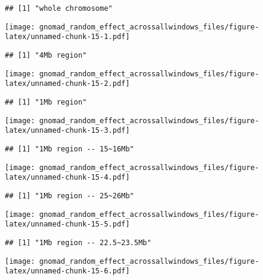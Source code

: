 \documentclass[
]{article}
\begin{document}
\begin{verbatim}
## [1] "whole chromosome"
\end{verbatim}

\texttt{[image: gnomad\_random\_effect\_acrossallwindows\_files/figure-latex/unnamed-chunk-15-1.pdf]}

\begin{verbatim}
## [1] "4Mb region"
\end{verbatim}

\texttt{[image: gnomad\_random\_effect\_acrossallwindows\_files/figure-latex/unnamed-chunk-15-2.pdf]}

\begin{verbatim}
## [1] "1Mb region"
\end{verbatim}

\texttt{[image: gnomad\_random\_effect\_acrossallwindows\_files/figure-latex/unnamed-chunk-15-3.pdf]}

\begin{verbatim}
## [1] "1Mb region -- 15~16Mb"
\end{verbatim}

\texttt{[image: gnomad\_random\_effect\_acrossallwindows\_files/figure-latex/unnamed-chunk-15-4.pdf]}

\begin{verbatim}
## [1] "1Mb region -- 25~26Mb"
\end{verbatim}

\texttt{[image: gnomad\_random\_effect\_acrossallwindows\_files/figure-latex/unnamed-chunk-15-5.pdf]}

\begin{verbatim}
## [1] "1Mb region -- 22.5~23.5Mb"
\end{verbatim}

\texttt{[image: gnomad\_random\_effect\_acrossallwindows\_files/figure-latex/unnamed-chunk-15-6.pdf]}
\end{document}
